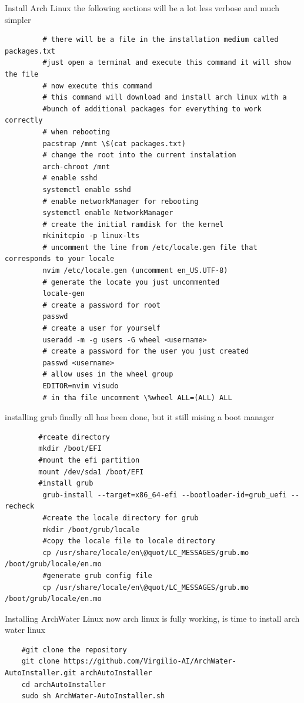 \begin{section}{Install Arch Linux}
	 the following sections will be a lot less verbose and much simpler
	 \begin{verbatim}
		 # there will be a file in the installation medium called packages.txt 
		 #just open a terminal and execute this command it will show the file
		 # now execute this command
		 # this command will download and install arch linux with a
		 #bunch of additional packages for everything to work correctly
		 # when rebooting
		 pacstrap /mnt \$(cat packages.txt)
		 # change the root into the current instalation
		 arch-chroot /mnt
		 # enable sshd
		 systemctl enable sshd
		 # enable networkManager for rebooting
		 systemctl enable NetworkManager
		 # create the initial ramdisk for the kernel
		 mkinitcpio -p linux-lts
		 # uncomment the line from /etc/locale.gen file that corresponds to your locale
		 nvim /etc/locale.gen (uncomment en_US.UTF-8)
		 # generate the locate you just uncommented
		 locale-gen
		 # create a password for root
		 passwd
		 # create a user for yourself
		 useradd -m -g users -G wheel <username>
		 # create a password for the user you just created
		 passwd <username>
		 # allow uses in the wheel group
		 EDITOR=nvim visudo
		 # in tha file uncomment \%wheel ALL=(ALL) ALL
	 \end{verbatim}
\end{section}
\newpage
\begin{section}{installing grub}
	finally all has been done, 
	but it still mising a boot manager
	\begin{verbatim}
		#rceate directory
		mkdir /boot/EFI
		#mount the efi partition
		mount /dev/sda1 /boot/EFI
		#install grub
		 grub-install --target=x86_64-efi --bootloader-id=grub_uefi --recheck
		 #create the locale directory for grub
		 mkdir /boot/grub/locale
		 #copy the locale file to locale directory
		 cp /usr/share/locale/en\@quot/LC_MESSAGES/grub.mo /boot/grub/locale/en.mo
		 #generate grub config file
		 cp /usr/share/locale/en\@quot/LC_MESSAGES/grub.mo /boot/grub/locale/en.mo

	\end{verbatim}
\end{section}

\newpage
\begin{section}{Installing ArchWater Linux}
now arch linux is fully working, is time to install arch water linux
\begin{verbatim}
	#git clone the repository 
	git clone https://github.com/Virgilio-AI/ArchWater-AutoInstaller.git archAutoInstaller
	cd archAutoInstaller
	sudo sh ArchWater-AutoInstaller.sh

\end{verbatim}
\end{section}

